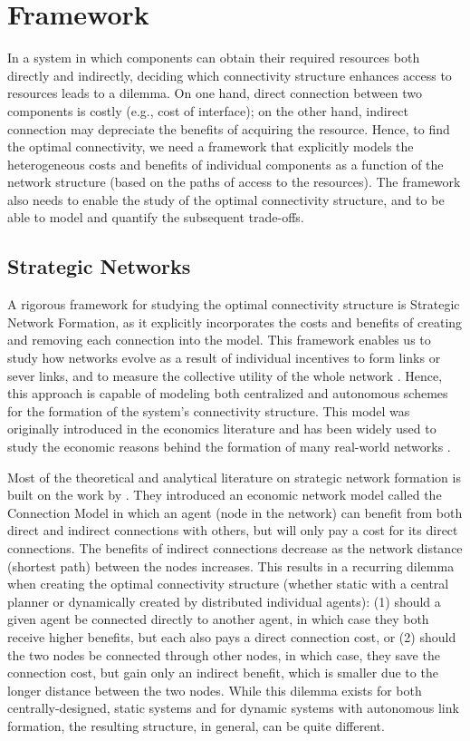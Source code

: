 \documentclass[journal,onecolumn]{IEEEtran}
\theoremstyle{plain}
\begin{document}
\section{Framework}
\label{framework}
In a system in which components can obtain their required resources both directly and indirectly, deciding which connectivity structure enhances access to resources leads to a dilemma. On one hand, direct connection between two components is costly (e.g., cost of interface); on the other hand, indirect connection may depreciate the benefits of acquiring the resource. Hence, to find the optimal connectivity, we need a framework that explicitly models the heterogeneous costs and benefits of individual components as a function of the network structure (based on the paths of access to the resources). The framework also needs to enable the study of the optimal connectivity structure, and to be able to model and quantify the subsequent trade-offs. 

\subsection{Strategic Networks}
A rigorous framework for studying the optimal connectivity structure is Strategic Network Formation, as it explicitly incorporates the costs and benefits of creating and removing each connection into the model. This framework enables us to study how networks evolve as a result of individual incentives to form links or sever links, and to measure the collective utility of the whole network \citep{jackson2008social}. Hence, this approach is capable of modeling both centralized and autonomous schemes for the formation of the system's connectivity structure. This model was originally introduced in the economics literature and has been widely used to study the economic reasons behind the formation of many real-world networks \citep{jackson2005economics, fricke2012core}.


Most of the theoretical and analytical literature on strategic network formation is built on the work by \cite{jackson1996strategic}. They introduced an economic  network model called the Connection Model in which an agent (node in the network) can benefit from both direct and indirect connections with others, but will only pay a cost for its direct connections. The benefits of indirect connections decrease as the network distance (shortest path) between the nodes increases. This results in a recurring dilemma when creating the optimal connectivity structure (whether static with a central planner or dynamically created by distributed individual agents): (1) should a given agent be connected directly to another agent, in which case they both receive higher benefits, but each also pays a direct connection cost, or (2) should the two nodes be connected through other nodes, in which case, they save the connection cost, but gain only an indirect benefit, which is smaller due to the longer distance between the two nodes. While this dilemma exists for both centrally-designed, static systems and for dynamic systems with autonomous link formation, the resulting structure, in general, can be quite different.
\end{document}
